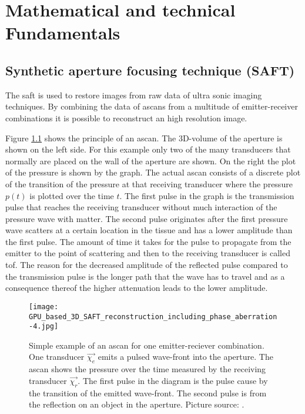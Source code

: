 \chapter{Mathematical and technical Fundamentals}
\label{chap:mathFund}

\section{Synthetic aperture focusing technique (SAFT)}
\label{sec:SAFT}
The \ac{saft} is used to restore images from raw data of ultra sonic imaging techniques.
By combining the data of \acp{ascan} from a multitude of emitter-receiver combinations it is possible to reconstruct an high resolution image.

Figure \ref{ascan_example} shows the principle of an \ac{ascan}. The 3D-volume of the aperture is shown on the left side. For this example only two of the many transducers that normally are placed on the wall of the aperture are shown. On the right the plot of the pressure is shown by the graph. The actual \ac{ascan} consists of a discrete plot of the transition of the pressure at that receiving transducer where the pressure $p(t)$ is plotted over the time $t$. The first pulse in the graph is the transmission pulse that reaches the receiving transducer without much interaction of the pressure wave with matter. The second pulse originates after the first pressure wave scatters at a certain location in the tissue and has a lower amplitude than the first pulse. The amount of time it takes for the pulse to propagate from the emitter to the point of scattering and then to the receiving transducer is called \ac{tof}. The reason for the decreased amplitude of the reflected pulse compared to the transmission pulse is the longer path that the wave has to travel and as a consequence thereof the higher attenuation leads to the lower amplitude. 


\begin{figure}[H]
    \centering
    \texttt{[image: GPU\_based\_3D\_SAFT\_reconstruction\_including\_phase\_aberration-4.jpg]}
    \caption{ Simple example of an \ac{ascan} for one emitter-reciever combination. One transducer $\overrightarrow{\chi_e}$ emits a pulsed wave-front into the aperture. The \ac{ascan} shows the pressure over the time measured by the receiving transducer $\overrightarrow{\chi_r}$. The first pulse in the diagram is the pulse cause by the transition of the emitted wave-front. The second pulse is from the reflection on an object in the aperture. Picture source: \cite{Kretzek2014GPUAberration}. }
    \label{ascan_example}
\end{figure}

